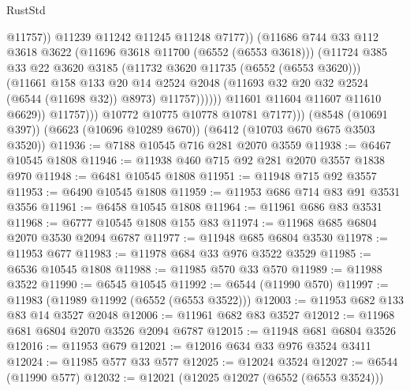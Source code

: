 \begin{lexlean}{RustStd}
\begin{coremodule}
                                  @11757))
                              @11239
                              @11242
                              @11245
                              @11248
                              @7177))
                          (@11686
                            @744
                            @33
                            @112
                            @3618
                            @3622
                            (@11696 @3618 @11700 (@6552 (@6553 @3618)))
                            (@11724
                              @385
                              @33
                              @22
                              @3620
                              @3185
                              (@11732 @3620 @11735 (@6552 (@6553 @3620)))
                              (@11661
                                @158
                                @133
                                @20
                                @14
                                @2524
                                @2048
                                (@11693 @32 @20 @32 @2524 (@6544 (@11698 @32)) @8973)
                                @11757))))))
                    @11601
                    @11604
                    @11607
                    @11610
                    @6629))
                @11757)))
          @10772
          @10775
          @10778
          @10781
          @7177)))
    (@8548 (@10691 @397))
    (@6623 (@10696 @10289 @670))
    (@6412 (@10703 @670 @675 @3503 @3520))
@11936 := @7188 @10545 @716 @281 @2070 @3559
@11938 := @6467 @10545 @1808
@11946 := @11938 @460 @715 @92 @281 @2070 @3557 @1838 @970
@11948 := @6481 @10545 @1808
@11951 := @11948 @715 @92 @3557
@11953 := @6490 @10545 @1808
@11959 := @11953 @686 @714 @83 @91 @3531 @3556
@11961 := @6458 @10545 @1808
@11964 := @11961 @686 @83 @3531
@11968 := @6777 @10545 @1808 @155 @83
@11974 := @11968 @685 @6804 @2070 @3530 @2094 @6787
@11977 := @11948 @685 @6804 @3530
@11978 := @11953 @677
@11983 := @11978 @684 @33 @976 @3522 @3529
@11985 := @6536 @10545 @1808
@11988 := @11985 @570 @33 @570
@11989 := @11988 @3522
@11990 := @6545 @10545
@11992 := @6544 (@11990 @570)
@11997 := @11983 (@11989 @11992 (@6552 (@6553 @3522)))
@12003 := @11953 @682 @133 @83 @14 @3527 @2048
@12006 := @11961 @682 @83 @3527
@12012 := @11968 @681 @6804 @2070 @3526 @2094 @6787
@12015 := @11948 @681 @6804 @3526
@12016 := @11953 @679
@12021 := @12016 @634 @33 @976 @3524 @3411
@12024 := @11985 @577 @33 @577
@12025 := @12024 @3524
@12027 := @6544 (@11990 @577)
@12032 := @12021 (@12025 @12027 (@6552 (@6553 @3524)))

\end{coremodule}
\end{lexlean}
